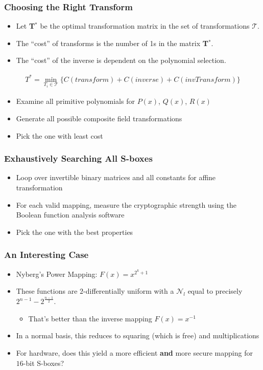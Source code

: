 \documentclass[handout]{beamer}
\begin{document}
\begin{frame}
	\frametitle{Choosing the Right Transform}
	\begin{itemize}
		\item Let \textbf{T}$^*$ be the optimal transformation matrix in the set of transformations $\mathcal{T}$.
		\item The ``cost'' of transforms is the number of 1s in the matrix \textbf{T}$^*$. 
		\item The ``cost'' of the inverse is dependent on the polynomial selection.
	\end{itemize}
	\begin{align*}
	T^* = \min_{T_i \in \mathcal{T}}\{C(transform) + C(inverse) + C(invTransform)\}
	\end{align*}
	\begin{itemize}
		\item Examine all primitive polynomials for $P(x)$, $Q(x)$, $R(x)$
		\item Generate all possible composite field transformations
		\item Pick the one with least cost
	\end{itemize}
\end{frame}

\begin{frame}
	\frametitle{Exhaustively Searching All S-boxes}
	\begin{itemize}
		\item Loop over invertible binary matrices and all constants for affine transformation
		\item For each valid mapping, measure the cryptographic strength using the Boolean function
		analysis software
		\item Pick the one with the best properties
	\end{itemize}
\end{frame}

\begin{frame}
	\frametitle{An Interesting Case}
	\begin{itemize}
		\item Nyberg's Power Mapping: $F(x) = x^{2^{k} + 1}$
		\item These functions are $2$-differentially uniform with a $\mathcal{N}_l$ equal to precisely $2^{n-1} - 2^{\frac{n-1}{2}}$.
		\begin{itemize}
			\item That's better than the inverse mapping $F(x) = x^{-1}$
		\end{itemize}
		\item In a normal basis, this reduces to squaring (which is free) and multiplications
		\item For hardware, does this yield a more efficient \textbf{and} more secure mapping for $16$-bit S-boxes?
	\end{itemize}
\end{frame}
\end{document}
